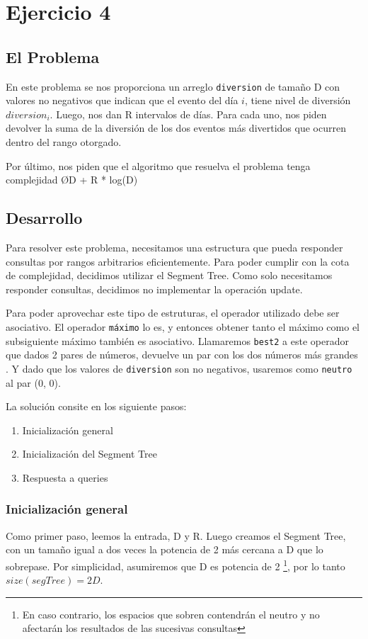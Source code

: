 \section{Ejercicio 4}
\subsection{El Problema}
En este problema se nos proporciona un arreglo \texttt{diversion} de tama\~no D con valores no negativos que indican que el evento del d\'ia $i$, tiene nivel de diversi\'on $diversion_i$. Luego, nos dan R intervalos de d\'ias. Para cada uno, nos piden devolver la suma de la diversi\'on de los dos eventos m\'as divertidos que ocurren dentro del rango otorgado.

Por último, nos piden que el algoritmo que resuelva el problema tenga complejidad \O{D + R * log(D)}

\subsection{Desarrollo}
Para resolver este problema, necesitamos una estructura que pueda responder consultas por rangos arbitrarios eficientemente. Para poder cumplir con la cota de complejidad, decidimos utilizar el Segment Tree. Como solo necesitamos responder consultas, decidimos no implementar la operaci\'on update. 

Para poder aprovechar este tipo de estruturas, el operador utilizado debe ser asociativo. El operador \texttt{m\'aximo} lo es, y entonces obtener tanto el m\'aximo como el subsiguiente m\'aximo tambi\'en es asociativo. Llamaremos \texttt{best2} a este operador que dados 2 pares de n\'umeros, devuelve un par con los dos n\'umeros m\'as grandes . Y dado que los valores de \texttt{diversion} son no negativos, usaremos como \texttt{neutro} al par (0, 0).

La solución consite en los siguiente pasos:
\begin{enumerate}
\item Inicialización general
\item Inicialización del Segment Tree
\item Respuesta a queries
\end{enumerate}

\subsubsection{Inicialización general}
Como primer paso, leemos la entrada, D y R. Luego creamos el Segment Tree, con un tama\~no igual a dos veces la potencia de 2 m\'as cercana a D que lo sobrepase. Por simplicidad, asumiremos que D es potencia de 2 \footnote{En caso contrario, los espacios que sobren contendr\'an el neutro y no afectar\'an los resultados de las sucesivas consultas}, por lo tanto $size(segTree) = 2D$.

